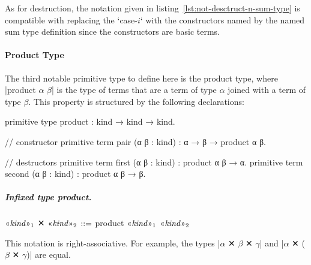 As for destruction, the notation given in listing~\ref{lst:not-desctruct-n-sum-type} is compatible with replacing the \code`case-$i$` with the constructors named by the named sum type definition since the constructors are basic terms.

\paragraph{Product Type}

The third notable primitive type to define here is the product type, where \code|product $α$ $β$| is the type of terms that are a term of type $α$ joined with a term of type $β$.
This property is structured by the following declarations:
\begin{program}[caption={Primitives for \code|product|.}]
primitive type product : kind → kind → kind.

// constructor
primitive term pair (α β : kind) : α → β → product α β.

// destructors
primitive term first (α β : kind) : product α β → α.
primitive term second (α β : kind) : product α β → β.
\end{program}

\subparagraph{Infixed type product.}
\begin{notational}[caption={Notation for infixed type product}]
$\mvar{kind}_1$ ✕ $\mvar{kind}_2$   $\syneq$   product $\mvar{kind}_1$ $\mvar{kind}_2$
\end{notational}
This notation is right-associative.
For example, the types \code|$α$ ✕ $β$ ✕ $γ$| and \code|$α$ ✕ ($β$ ✕ $γ$)| are equal.

